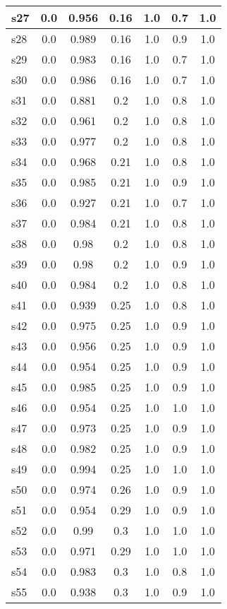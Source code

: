 \documentclass{article}
\begin{document}
\begin{tabular}{|l|c|c|c|c|c|c|}
\hline
s27 &0.0 & 0.956 & 0.16 & 1.0 & 0.7 & 1.0\\
\hline
s28 &0.0 & 0.989 & 0.16 & 1.0 & 0.9 & 1.0\\
\hline
s29 &0.0 & 0.983 & 0.16 & 1.0 & 0.7 & 1.0\\
\hline
s30 &0.0 & 0.986 & 0.16 & 1.0 & 0.7 & 1.0\\
\hline
s31 &0.0 & 0.881 & 0.2 & 1.0 & 0.8 & 1.0\\
\hline
s32 &0.0 & 0.961 & 0.2 & 1.0 & 0.8 & 1.0\\
\hline
s33 &0.0 & 0.977 & 0.2 & 1.0 & 0.8 & 1.0\\
\hline
s34 &0.0 & 0.968 & 0.21 & 1.0 & 0.8 & 1.0\\
\hline
s35 &0.0 & 0.985 & 0.21 & 1.0 & 0.9 & 1.0\\
\hline
s36 &0.0 & 0.927 & 0.21 & 1.0 & 0.7 & 1.0\\
\hline
s37 &0.0 & 0.984 & 0.21 & 1.0 & 0.8 & 1.0\\
\hline
s38 &0.0 & 0.98 & 0.2 & 1.0 & 0.8 & 1.0\\
\hline
s39 &0.0 & 0.98 & 0.2 & 1.0 & 0.9 & 1.0\\
\hline
s40 &0.0 & 0.984 & 0.2 & 1.0 & 0.8 & 1.0\\
\hline
s41 &0.0 & 0.939 & 0.25 & 1.0 & 0.8 & 1.0\\
\hline
s42 &0.0 & 0.975 & 0.25 & 1.0 & 0.9 & 1.0\\
\hline
s43 &0.0 & 0.956 & 0.25 & 1.0 & 0.9 & 1.0\\
\hline
s44 &0.0 & 0.954 & 0.25 & 1.0 & 0.9 & 1.0\\
\hline
s45 &0.0 & 0.985 & 0.25 & 1.0 & 0.9 & 1.0\\
\hline
s46 &0.0 & 0.954 & 0.25 & 1.0 & 1.0 & 1.0\\
\hline
s47 &0.0 & 0.973 & 0.25 & 1.0 & 0.9 & 1.0\\
\hline
s48 &0.0 & 0.982 & 0.25 & 1.0 & 0.9 & 1.0\\
\hline
s49 &0.0 & 0.994 & 0.25 & 1.0 & 1.0 & 1.0\\
\hline
s50 &0.0 & 0.974 & 0.26 & 1.0 & 0.9 & 1.0\\
\hline
s51 &0.0 & 0.954 & 0.29 & 1.0 & 0.9 & 1.0\\
\hline
s52 &0.0 & 0.99 & 0.3 & 1.0 & 1.0 & 1.0\\
\hline
s53 &0.0 & 0.971 & 0.29 & 1.0 & 1.0 & 1.0\\
\hline
s54 &0.0 & 0.983 & 0.3 & 1.0 & 0.8 & 1.0\\
\hline
s55 &0.0 & 0.938 & 0.3 & 1.0 & 0.9 & 1.0\\

\end{tabular}
\end{document}
